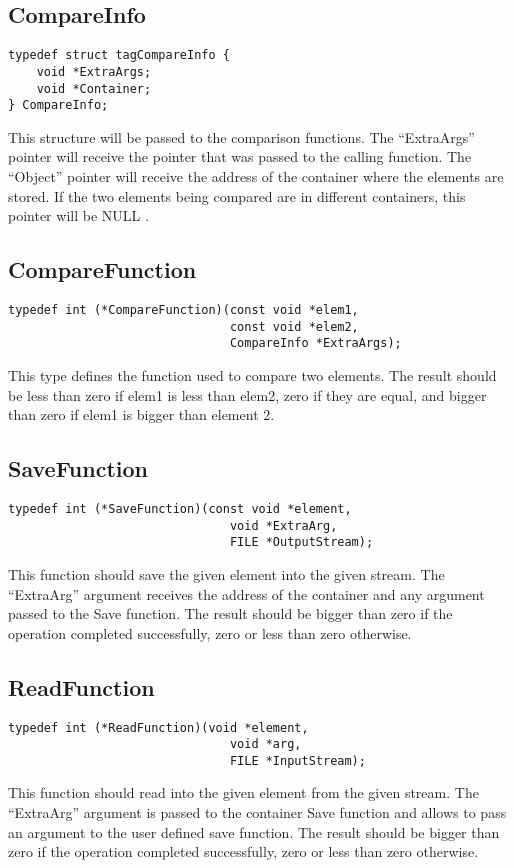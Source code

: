 \documentclass[12pt,a4paper]{memoir} %
\newcommand{\Null}{
{\footnotesize NULL}
}
\begin{document}
\subsection{CompareInfo}
\begin{verbatim}
typedef struct tagCompareInfo {
    void *ExtraArgs;
    void *Container;
} CompareInfo;
\end{verbatim}
This structure will be passed to the comparison functions. The “ExtraArgs” pointer will receive the pointer that was passed to the calling function. The “Object” pointer will receive the address of the container where the elements are stored. If the two elements being compared are in different containers, this pointer will be\Null.
\subsection{CompareFunction}
\begin{verbatim}
typedef int (*CompareFunction)(const void *elem1, 
                               const void *elem2, 
                               CompareInfo *ExtraArgs);
\end{verbatim}
This type defines the function used to compare two elements.
The result should be less than zero if elem1 is less than elem2, zero if they are equal, and bigger than zero if elem1 is bigger than element 2.
\subsection{SaveFunction}
\begin{verbatim}
typedef int (*SaveFunction)(const void *element, 
                               void *ExtraArg, 
                               FILE *OutputStream);
\end{verbatim}
This function should save the given element into the given stream.  The “ExtraArg” argument receives the address of the container and any argument passed to the Save function.
The result should be bigger than zero if the operation completed successfully, zero or less than zero otherwise.
\subsection{ReadFunction}
\begin{verbatim}
typedef int (*ReadFunction)(void *element, 
                               void *arg, 
                               FILE *InputStream);
\end{verbatim}
This function should read into the given element from the given stream. The “ExtraArg” argument is passed to the container Save function and allows to pass an argument to the user defined save function.
The result should be bigger than zero if the operation completed successfully, zero or less than zero otherwise.
\end{document}
